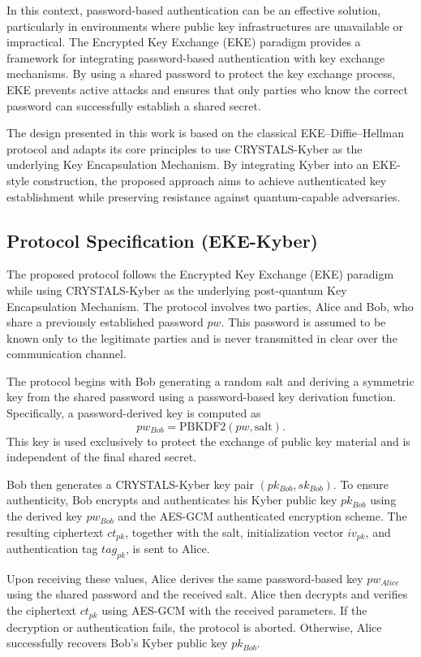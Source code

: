 \documentclass[12pt]{article}
\begin{document}
In this context, password-based authentication can be an effective solution, particularly in environments where public key infrastructures are unavailable or impractical. The Encrypted Key Exchange (EKE) paradigm \cite{bellovin1992} provides a framework for integrating password-based authentication with key exchange mechanisms. By using a shared password to protect the key exchange process, EKE prevents active attacks and ensures that only parties who know the correct password can successfully establish a shared secret.

The design presented in this work is based on the classical EKE–Diffie–Hellman protocol \cite{bellovin1992} and adapts its core principles to use CRYSTALS-Kyber as the underlying Key Encapsulation Mechanism. By integrating Kyber into an EKE-style construction, the proposed approach aims to achieve authenticated key establishment while preserving resistance against quantum-capable adversaries.


\subsection{Protocol Specification (EKE-Kyber)}

The proposed protocol follows the Encrypted Key Exchange (EKE) paradigm while using CRYSTALS-Kyber as the underlying post-quantum Key Encapsulation Mechanism. The protocol involves two parties, Alice and Bob, who share a previously established password \( pw \). This password is assumed to be known only to the legitimate parties and is never transmitted in clear over the communication channel.

The protocol begins with Bob generating a random salt and deriving a symmetric key from the shared password using a password-based key derivation function. Specifically, a password-derived key is computed as
\[
pw_{Bob} = \mathrm{PBKDF2}(pw, \mathrm{salt}).
\]
This key is used exclusively to protect the exchange of public key material and is independent of the final shared secret.

Bob then generates a CRYSTALS-Kyber key pair \((pk_{Bob}, sk_{Bob})\). To ensure authenticity, Bob encrypts and authenticates his Kyber public key \(pk_{Bob}\) using the derived key \(pw_{Bob}\) and the AES-GCM authenticated encryption scheme. The resulting ciphertext \(ct_{pk}\), together with the salt, initialization vector \(iv_{pk}\), and authentication tag \(tag_{pk}\), is sent to Alice.

Upon receiving these values, Alice derives the same password-based key \(pw_{Alice}\) using the shared password and the received salt. Alice then decrypts and verifies the ciphertext \(ct_{pk}\) using AES-GCM with the received parameters. If the decryption or authentication fails, the protocol is aborted. Otherwise, Alice successfully recovers Bob’s Kyber public key \(pk_{Bob}\).
\end{document}
